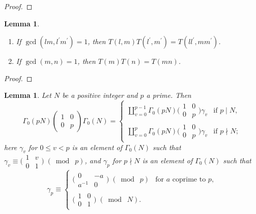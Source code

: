 \documentclass[10pt,leqno,twoside]{article}
\theoremstyle{plain}
\newtheorem{lemma}[lem]{Lemma}
\theoremstyle{definition}
\numberwithin{equation}{section}
\numberwithin{lem}{section}
\newcommand{\textib}[1]{\textbf{\textit{#1\index{#1}}}} %
\newcommand{\smod}[1]{\;(\bmod\; #1)}
\newcommand{\tbd}{{\Huge\color{red}{\textib{TBD}}}}
\begin{document}
\begin{proof}
    \tbd
\end{proof}
\begin{lemma}\label{lem: miyake lem 4.5.8}
    \begin{enumerate}[label=\textup{(\arabic*)}]
        \item If $\gcd(lm,l^\prime m^\prime) = 1$, then $T(l,m)T(l^\prime,m^\prime) = T(ll^\prime,mm^\prime)$.
        \item If $\gcd(m,n) = 1$, then $T(m)T(n) = T(mn)$.
    \end{enumerate}
\end{lemma}
\begin{proof}
    \tbd
\end{proof}
\begin{lemma}\label{lem: miyake lem 4.5.11}
    Let $N$ be a positive integer and $p$ a prime. Then 
    \[\varGamma_0(pN)\begin{pmatrix}
        1 & 0 \\ 0 & p
    \end{pmatrix}\varGamma_0(N) = \begin{cases}
        \coprod_{v = 0}^{p-1}\varGamma_0(pN)\big(\!\begin{smallmatrix}
            1 & 0 \\ 0 & p
        \end{smallmatrix}\!\big)\gamma_v& \text{if $p\mid N$},\\
        \coprod_{v = 0}^p\varGamma_0(pN)\big(\!\begin{smallmatrix}
            1 & 0 \\ 0 & p
        \end{smallmatrix}\!\big)\gamma_v& \text{if $p\nmid N$};
    \end{cases}\]
    here  $\gamma_v$ for $0\leq v<p$ is an element of $\varGamma_0(N)$ such that $\gamma_v \equiv \big(\!\begin{smallmatrix}
        1 & v \\ 0 & 1
    \end{smallmatrix}\!\big)\smod{p}$, and $\gamma_p$ for $p\nmid N$ is an element of $\varGamma_0(N)$ such that 
    \[\gamma_p \equiv\begin{cases}
        \big(\!\begin{smallmatrix}
            0 & -a \\ a^{-1} & 0
        \end{smallmatrix}\!\big)\smod{p}&\text{for $a$ coprime to $p$},\\
        \big(\!\begin{smallmatrix}
            1 & 0 \\ 0 & 1
        \end{smallmatrix}\!\big)\smod{N}.
    \end{cases}\]
\end{lemma}
\end{document}
